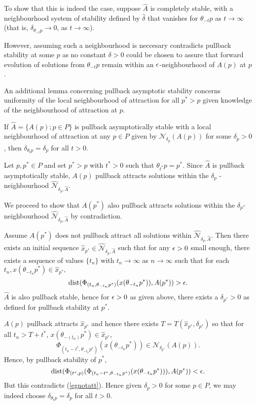 To show that this is indeed the case, suppose $\hat{A}$ is completely stable,
with a neighbourhood system of stability defined by $\hat{\delta}$ that vanishes
for $\theta_{-t}p$ as $t \to \infty$ (that is, $\delta_{\theta_{-t}p} \to 0$, as
$t \to \infty$).

However, assuming such a neighbourhood is neccesary contradicts
pullback stability at some $p$ as no constant $\delta > 0$ could be chosen to
assure that forward evolution of solutions from $\theta_{-t}p$ remain within an
$\epsilon$-neighbourhood of $A(p)$ at $p$.

An additional lemma concerning pullback asymptotic stability concerns uniformity
of the local neighbourhood of attraction for all $p^* > p$ given knowledge of
the neighbourhood of attraction at $p$.

\begin{lemma}
If $\hat{A} = \{ A(p) ; p \in P \}$ is pullback asymptotically stable with a
local neighbourhood of attraction at any $p \in P$ given by
$\mathcal{N}_{\delta_p}(A(p))$ for some $\delta_p > 0$, then $\delta_{\theta_tp}
= \delta_p$ for all $t > 0$.
\end{lemma}
\begin{prf}
Let $p, p^* \in P$ and set $p^* > p$ with $t^* > 0$ such that $\theta_{t^*}p =
p^*$. Since $\hat{A}$ is pullback asymptotically stable, $A(p)$ pullback
attracts solutions within the $\delta_p$ - neighbourhood $\hat{\mathcal{N}}_{\delta_p,
\hat{A}}$.

We proceed to show that $A(p^*)$ also pullback attracts solutions within the
$\delta_p$-neighbourhood $\hat{\mathcal{N}}_{\delta_p, \hat{A}}$ by contradiction.

Assume $A(p^*)$ does not pullback attract all solutions within
$\hat{\mathcal{N}}_{\delta_p, \hat{A}}$. Then there exists an initial sequence
$\hat{x}_{p^*} \in \hat{\mathcal{N}}_{\delta_p, \hat{A}}$ such that for any $\epsilon > 0$
small enough, there exists a sequence of values $\{ t_n \}$ with $t_n \to
\infty$ as $n \to \infty$ such that for each $t_n, x(\theta_{-t_n}p^*) \in
\hat{x}_{p^*},$
\begin{equation}\label{egnotatt}
{\rm dist}(\Phi_{(t_n, \theta_{-t_n}p^*)}(x(\theta_{-t_n}p^*)),
                       A(p^*)) > \epsilon.
\end{equation}
$\hat{A}$ is also pullback stable, hence for $\epsilon > 0$ as given above, there
exists a $\delta_{p^*} > 0$ as defined for pullback stability at $p^*$.

$A(p)$ pullback attracts $\hat{x}_{p^*}$ and hence there exists
$T=T(\hat{x}_{p^*}, \delta_{p^*})$ so that for all $t_n>T+t^*$,
$x(\theta_{-(t_n)}p^*) \in \hat{x}_{p^*}$,
\[ \Phi_{(t_n-t^*, \theta_{-t_n}p^*)}(x(\theta_{-t_n}p^*)) \in
              \mathcal{N}_{\delta_{p^*}}(A(p)). \]
Hence, by pullback stability of $p^*$,
\[ {\rm dist}(\Phi_{(t^*, p)}(\Phi_{(t_n-t^*,
                   \theta_{-t_n}p^*)}(x(\theta_{-t_n}p^*))), A(p^*)) < \epsilon. \]
But this contradicts (\ref{egnotatt}). Hence given $\delta_p > 0$ for some $p
\in P$, we may indeed choose $\delta_{\theta_tp} = \delta_p$ for all $t > 0$.
\end{prf}

